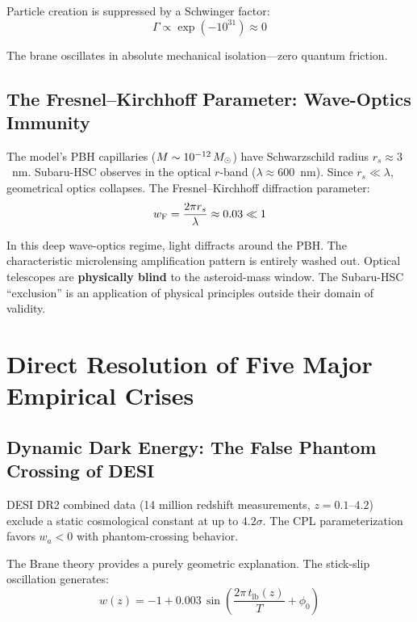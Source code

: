 Particle creation is suppressed by a Schwinger factor:
\begin{equation}
\Gamma \propto \exp\!\left(-10^{31}\right) \approx 0
\end{equation}

The brane oscillates in absolute mechanical isolation---zero quantum friction.

\subsection{The Fresnel--Kirchhoff Parameter: Wave-Optics Immunity}
\label{sec:fresnel}

The model's PBH capillaries ($M \sim 10^{-12}\,M_\odot$) have Schwarzschild radius $r_s \approx 3$~nm. Subaru-HSC observes in the optical $r$-band ($\lambda \approx 600$~nm). Since $r_s \ll \lambda$, geometrical optics collapses. The Fresnel--Kirchhoff diffraction parameter:
\begin{equation}
w_\text{F} = \frac{2\pi r_s}{\lambda} \approx 0.03 \ll 1
\end{equation}

In this deep wave-optics regime, light diffracts around the PBH. The characteristic microlensing amplification pattern is entirely washed out. Optical telescopes are \textbf{physically blind} to the asteroid-mass window. The Subaru-HSC ``exclusion'' is an application of physical principles outside their domain of validity.

\section{Direct Resolution of Five Major Empirical Crises}
\label{sec:five_crises}

\subsection{Dynamic Dark Energy: The False Phantom Crossing of DESI}
\label{sec:desi_phantom}

DESI DR2 combined data (14 million redshift measurements, $z = 0.1$--$4.2$) exclude a static cosmological constant at up to $4.2\sigma$. The CPL parameterization favors $w_a < 0$ with phantom-crossing behavior.

The Brane theory provides a purely geometric explanation. The stick-slip oscillation generates:
\begin{equation}
w(z) = -1 + 0.003\,\sin\!\left(\frac{2\pi\, t_\text{lb}(z)}{T} + \phi_0\right)
\end{equation}

